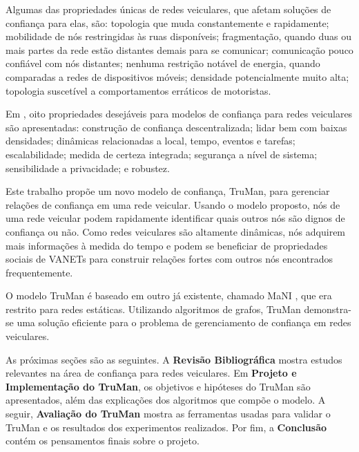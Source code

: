 \begin{resumoextendido}
	Algumas das propriedades únicas de redes veiculares, que afetam soluções de confiança para elas, são:
	topologia que muda constantemente e rapidamente;
	mobilidade de nós restringidas às ruas disponíveis;
	fragmentação, quando duas ou mais partes da rede estão distantes demais para se comunicar;
	comunicação pouco confiável com nós distantes;
	nenhuma restrição notável de energia, quando comparadas a redes de dispositivos móveis;
	densidade potencialmente muito alta;
	topologia suscetível a comportamentos erráticos de motoristas.
	
	Em \citep{zhang2011survey}, oito propriedades desejáveis para modelos de confiança para redes veiculares são apresentadas:
	construção de confiança descentralizada;
	lidar bem com baixas densidades;
	dinâmicas relacionadas a local, tempo, eventos e tarefas;
	escalabilidade;
	medida de certeza integrada;
	segurança a nível de sistema;
	sensibilidade a privacidade; e
	robustez.

	Este trabalho propõe um novo modelo de confiança, TruMan, para gerenciar relações de confiança em uma rede veicular.
	Usando o modelo proposto, nós de uma rede veicular podem rapidamente identificar quais outros nós são dignos de confiança ou não.
	Como redes veiculares são altamente dinâmicas, nós adquirem mais informações à medida do tempo e podem se beneficiar de propriedades sociais de VANETs para construir relações fortes com outros nós encontrados frequentemente.
	
	O modelo TruMan é baseado em outro já existente, chamado MaNI \citep{vernize2015malicious}, que era restrito para redes estáticas.
	Utilizando algoritmos de grafos, TruMan demonstra-se uma solução eficiente para o problema de gerenciamento de confiança em redes veiculares.
	
	As próximas seções são as seguintes.
	A \textbf{Revisão Bibliográfica} mostra estudos relevantes na área de confiança para redes veiculares.
	Em \textbf{Projeto e Implementação do TruMan}, os objetivos e hipóteses do TruMan são apresentados, além das explicações dos algoritmos que compõe o modelo.
	A seguir, \textbf{Avaliação do TruMan} mostra as ferramentas usadas para validar o TruMan e os resultados dos experimentos realizados.
	Por fim, a \textbf{Conclusão} contém os pensamentos finais sobre o projeto.
		

\end{resumoextendido}
